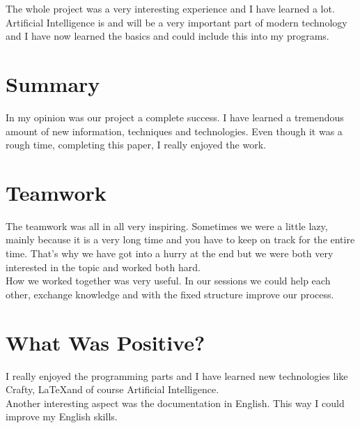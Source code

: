 %
%
%
%

\def\Title{Reflection}
\def\Author{Nicolas Ganz}
\def\Date{\today}







\maketitle %

The whole project was a very interesting experience and I have learned a lot. Artificial Intelligence is and will be a very important part of modern technology and I have now learned the basics and could include this into my programs.

\section*{Summary}
In my opinion was our project a complete success. I have learned a tremendous amount of new information, techniques and technologies. Even though it was a rough time, completing this paper, I really enjoyed the work.

\section*{Teamwork}
The teamwork was all in all very inspiring. Sometimes we were a little lazy, mainly because it is a very long time and you have to keep on track for the entire time. That's why we have got into a hurry at the end but we were both very interested in the topic and worked both hard.\medskip\\
How we worked together was very useful. In our sessions we could help each other, exchange knowledge and with the fixed structure improve our process.

\section*{What Was Positive?}
I really enjoyed the programming parts and I have learned new technologies like Crafty, \LaTeX and of course Artificial Intelligence.\medskip\\
Another interesting aspect was the documentation in English. This way I could improve my English skills.

